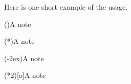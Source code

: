 \documentclass[toc=index,toc=bib,mpinclude]{cnpkgdoc}
\begin{document}
Here is one short example of the usage.

\begin{beispiel}


 \sidenote(){A note}

 \sidenote(*){A note}

 \sidenote(-2ex){A note}

 \sidenote(*2)[a]{A note}
\end{beispiel}
\end{document}
